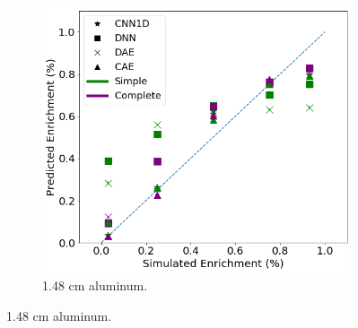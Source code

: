 \begin{figure}[H]
\begin{subfigure}[b]{0.49\textwidth}
         \includegraphics[width=\textwidth]{images/simuranium-lightal.png}
         \caption{1.48 cm aluminum.}
         \label{fig:simuranium-lightal}
     \end{subfigure}


\end{figure}

